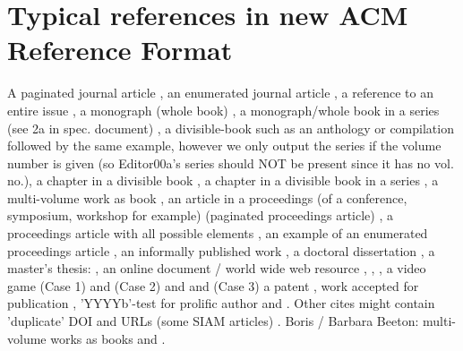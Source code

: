 
\section{Typical references in new ACM Reference Format}
A paginated journal article \cite{Abril07}, an enumerated
journal article \cite{Cohen07}, a reference to an entire issue \cite{JCohen96},
a monograph (whole book) \cite{Kosiur01}, a monograph/whole book in a series (see 2a in spec. document)
\cite{Harel79}, a divisible-book such as an anthology or compilation \cite{Editor00}
followed by the same example, however we only output the series if the volume number is given
\cite{Editor00a} (so Editor00a's series should NOT be present since it has no vol. no.),
a chapter in a divisible book \cite{Spector90}, a chapter in a divisible book
in a series \cite{Douglass98}, a multi-volume work as book \cite{Knuth97},
an article in a proceedings (of a conference, symposium, workshop for example)
(paginated proceedings article) \cite{Andler79}, a proceedings article
with all possible elements \cite{Smith10}, an example of an enumerated
proceedings article \cite{VanGundy07},
an informally published work \cite{Harel78}, a doctoral dissertation \cite{Clarkson85},
a master's thesis: \cite{anisi03}, an online document / world wide web resource \cite{Thornburg01}, \cite{Ablamowicz07},
\cite{Poker06}, a video game (Case 1) \cite{Obama08} and (Case 2) \cite{Novak03}
and \cite{Lee05} and (Case 3) a patent \cite{JoeScientist001},
work accepted for publication \cite{rous08}, 'YYYYb'-test for prolific author
\cite{SaeediMEJ10} and \cite{SaeediJETC10}. Other cites might contain
'duplicate' DOI and URLs (some SIAM articles) \cite{Kirschmer:2010:AEI:1958016.1958018}.
Boris / Barbara Beeton: multi-volume works as books
\cite{MR781536} and \cite{MR781537}.

